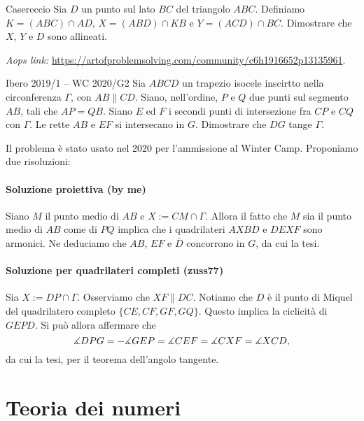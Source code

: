 \documentclass{article}
\begin{document}
\begin{proposition}{Casereccio}{}
	Sia $D$ un punto sul lato $BC$ del triangolo $ABC$. Definiamo
	$K=(ABC)\cap AD$, $X=(ABD)\cap KB$ e $Y=(ACD)\cap BC$.
	Dimostrare che $X$, $Y$ e $D$
	sono allineati.
\end{proposition}

\vspace{0.5cm}
\textit{Aops link:}
\href{https://artofproblemsolving.com/community/c6h1916652p13135961}
{https://artofproblemsolving.com/community/c6h1916652p13135961}.

\begin{proposition}{Ibero 2019/1 -- WC 2020/G2}{}
	Sia $ABCD$ un trapezio isocele inscirtto nella circonferenza $\Gamma$,
	con $AB\parallel CD$.
	Siano, nell'ordine, $P$ e $Q$ due punti sul segmento $AB$, tali che
	$AP=QB$. Siano $E$ ed $F$ i secondi punti di intersezione fra $CP$ e $CQ$
	con $\Gamma$. Le rette $AB$ e $EF$ si intersecano in $G$. Dimostrare che
	$DG$ tange $\Gamma$.
\end{proposition}

Il problema è stato usato nel 2020 per l'ammissione al Winter Camp.
Proponiamo due risoluzioni:

\paragraph{Soluzione proiettiva (by me)}
Siano $M$ il punto medio di $AB$ e $X:=CM\cap \Gamma$.
Allora il fatto che $M$ sia il punto medio di $AB$ come di $PQ$ implica
che i quadrilateri $AXBD$ e $DEXF$ sono armonici. Ne deduciamo che
$AB$, $EF$ e $\bar{D}$ concorrono in $G$, da cui la tesi.

\paragraph{Soluzione per quadrilateri completi (zuss77)}
Sia $X:=DP\cap \Gamma$. Osserviamo che $XF\parallel DC$.
Notiamo che $D$ è il punto di Miquel del quadrilatero completo
$\{ CE, CF, GF, GQ \}$. Questo implica la ciclicità di $GEPD$.
Si può allora affermare che
\begin{equation*}
	\measuredangle{DPG}=-\measuredangle{GEP}=\measuredangle{CEF}=\measuredangle{CXF}=\measuredangle{XCD},
\end{equation*}
da cui la tesi, per il teorema dell'angolo tangente.

\pagebreak
\section{Teoria dei numeri}
\end{document}
